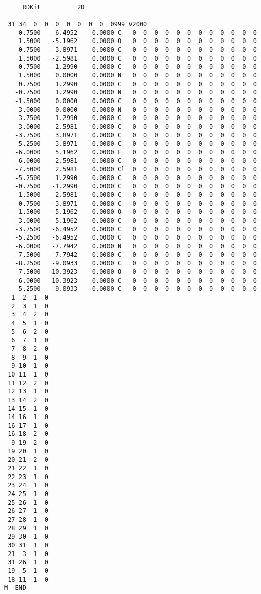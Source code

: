 \documentclass[11pt]{article}
\begin{document}
    \begin{Verbatim}[commandchars=\\\{\}]

     RDKit          2D

 31 34  0  0  0  0  0  0  0  0999 V2000
    0.7500   -6.4952    0.0000 C   0  0  0  0  0  0  0  0  0  0  0  0
    1.5000   -5.1962    0.0000 O   0  0  0  0  0  0  0  0  0  0  0  0
    0.7500   -3.8971    0.0000 C   0  0  0  0  0  0  0  0  0  0  0  0
    1.5000   -2.5981    0.0000 C   0  0  0  0  0  0  0  0  0  0  0  0
    0.7500   -1.2990    0.0000 C   0  0  0  0  0  0  0  0  0  0  0  0
    1.5000    0.0000    0.0000 N   0  0  0  0  0  0  0  0  0  0  0  0
    0.7500    1.2990    0.0000 C   0  0  0  0  0  0  0  0  0  0  0  0
   -0.7500    1.2990    0.0000 N   0  0  0  0  0  0  0  0  0  0  0  0
   -1.5000    0.0000    0.0000 C   0  0  0  0  0  0  0  0  0  0  0  0
   -3.0000    0.0000    0.0000 N   0  0  0  0  0  0  0  0  0  0  0  0
   -3.7500    1.2990    0.0000 C   0  0  0  0  0  0  0  0  0  0  0  0
   -3.0000    2.5981    0.0000 C   0  0  0  0  0  0  0  0  0  0  0  0
   -3.7500    3.8971    0.0000 C   0  0  0  0  0  0  0  0  0  0  0  0
   -5.2500    3.8971    0.0000 C   0  0  0  0  0  0  0  0  0  0  0  0
   -6.0000    5.1962    0.0000 F   0  0  0  0  0  0  0  0  0  0  0  0
   -6.0000    2.5981    0.0000 C   0  0  0  0  0  0  0  0  0  0  0  0
   -7.5000    2.5981    0.0000 Cl  0  0  0  0  0  0  0  0  0  0  0  0
   -5.2500    1.2990    0.0000 C   0  0  0  0  0  0  0  0  0  0  0  0
   -0.7500   -1.2990    0.0000 C   0  0  0  0  0  0  0  0  0  0  0  0
   -1.5000   -2.5981    0.0000 C   0  0  0  0  0  0  0  0  0  0  0  0
   -0.7500   -3.8971    0.0000 C   0  0  0  0  0  0  0  0  0  0  0  0
   -1.5000   -5.1962    0.0000 O   0  0  0  0  0  0  0  0  0  0  0  0
   -3.0000   -5.1962    0.0000 C   0  0  0  0  0  0  0  0  0  0  0  0
   -3.7500   -6.4952    0.0000 C   0  0  0  0  0  0  0  0  0  0  0  0
   -5.2500   -6.4952    0.0000 C   0  0  0  0  0  0  0  0  0  0  0  0
   -6.0000   -7.7942    0.0000 N   0  0  0  0  0  0  0  0  0  0  0  0
   -7.5000   -7.7942    0.0000 C   0  0  0  0  0  0  0  0  0  0  0  0
   -8.2500   -9.0933    0.0000 C   0  0  0  0  0  0  0  0  0  0  0  0
   -7.5000  -10.3923    0.0000 O   0  0  0  0  0  0  0  0  0  0  0  0
   -6.0000  -10.3923    0.0000 C   0  0  0  0  0  0  0  0  0  0  0  0
   -5.2500   -9.0933    0.0000 C   0  0  0  0  0  0  0  0  0  0  0  0
  1  2  1  0
  2  3  1  0
  3  4  2  0
  4  5  1  0
  5  6  2  0
  6  7  1  0
  7  8  2  0
  8  9  1  0
  9 10  1  0
 10 11  1  0
 11 12  2  0
 12 13  1  0
 13 14  2  0
 14 15  1  0
 14 16  1  0
 16 17  1  0
 16 18  2  0
  9 19  2  0
 19 20  1  0
 20 21  2  0
 21 22  1  0
 22 23  1  0
 23 24  1  0
 24 25  1  0
 25 26  1  0
 26 27  1  0
 27 28  1  0
 28 29  1  0
 29 30  1  0
 30 31  1  0
 21  3  1  0
 31 26  1  0
 19  5  1  0
 18 11  1  0
M  END

\end{Verbatim}
\end{document}
